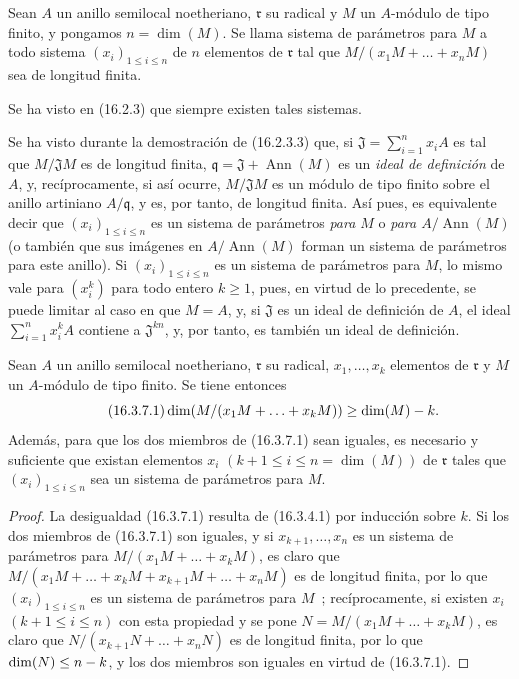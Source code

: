 \begin{definition}[16.3.6]
\label{0.16.3.6-fr}
Sean $A$ un anillo semilocal noetheriano, $\mathfrak{r}$ su radical y $M$ un
$A$-módulo de tipo finito, y pongamos $n=\dim(M)$. Se llama sistema de
parámetros para $M$ a todo sistema $(x_i)_{1\leq i\leq n}$ de $n$ elementos de
$\mathfrak{r}$ tal que $M/(x_1M+\ldots+x_nM)$ sea de longitud finita.
\end{definition}

Se ha visto en (16.2.3) que siempre existen tales sistemas.

Se ha visto durante la demostración de (16.2.3.3) que, si
$\mathfrak{J}=\sum_{i=1}^n x_iA$ es tal que $M/\mathfrak{J}M$ es de
longitud finita, $\mathfrak{q}=\mathfrak{J}+\operatorname{Ann}(M)$ es un
\emph{ideal de definición} de $A$, y, recíprocamente, si así ocurre,
$M/\mathfrak{J}M$ es un módulo de tipo finito sobre el anillo artiniano
$A/\mathfrak{q}$, y es, por tanto, de longitud finita. Así pues, es equivalente decir
que $(x_i)_{1\leq i\leq n}$ es un sistema de parámetros \emph{para $M$} o
\emph{para $A/\operatorname{Ann}(M)$} (o también que sus imágenes en
$A/\operatorname{Ann}(M)$ forman un sistema de parámetros para este anillo).
Si $(x_i)_{1\leq i\leq n}$ es un sistema de parámetros para $M$, lo mismo vale
para $(x_i^k)$ para todo entero $k\geq1$, pues, en virtud de lo precedente,
se puede limitar al caso en que $M=A$, y, si $\mathfrak{J}$ es un ideal de
definición de $A$, el ideal $\sum_{i=1}^n x_i^kA$ contiene a
$\mathfrak{J}^{kn}$, y, por tanto, es también un ideal de definición.

\begin{proposition}[16.3.7]
\label{0.16.3.7-fr}
Sean $A$ un anillo semilocal noetheriano, $\mathfrak{r}$ su radical,
$x_1,\ldots,x_k$ elementos de $\mathfrak{r}$ y $M$ un $A$-módulo de tipo
finito. Se tiene entonces
\begin{equation}
\label{0.16.3.7.1-fr}
\tag{16.3.7.1}
  \dim(M/(x_1M+\ldots+x_kM))\geq\dim(M)- k.
\end{equation}
Además, para que los dos miembros de \textup{(16.3.7.1)} sean iguales, es necesario y
suficiente que existan elementos $x_i$
$(k+1\leq i\leq n=\dim(M))$ de $\mathfrak{r}$ tales que
$(x_i)_{1\leq i\leq n}$ sea un sistema de parámetros para $M$.
\end{proposition}

\begin{proof}
La desigualdad (16.3.7.1) resulta de (16.3.4.1) por inducción sobre $k$. Si los
dos miembros de (16.3.7.1) son iguales, y si $x_{k+1},\ldots,x_n$ es un
sistema de parámetros para $M/(x_1M+\ldots+x_kM)$, es claro que
$M/(x_1M+\ldots+x_kM+x_{k+1}M+\ldots+x_nM)$ es de longitud finita, por lo que
$(x_i)_{1\leq i\leq n}$ es un sistema de parámetros para $M$~;
recíprocamente, si existen $x_i$ $(k+1\leq i\leq n)$ con esta propiedad y se
pone $N=M/(x_1M+\ldots+x_kM)$, es claro que
$N/(x_{k+1}N+\ldots+x_nN)$ es de longitud finita, por lo que
$\dim(N)\leq n- k$, y los dos miembros son iguales en virtud de (16.3.7.1).
\end{proof}

